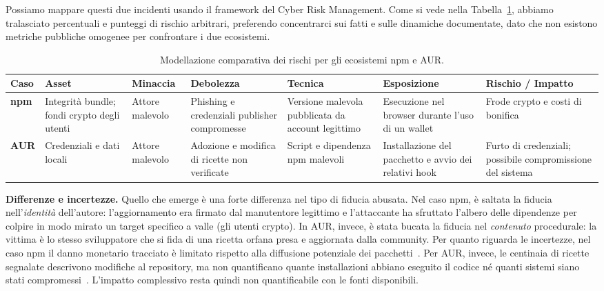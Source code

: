 Possiamo mappare questi due incidenti usando il framework del Cyber Risk Management. Come si vede nella Tabella~\ref{tab:rischi_comparati}, abbiamo tralasciato percentuali e punteggi di rischio arbitrari, preferendo concentrarci sui fatti e sulle dinamiche documentate, dato che non esistono metriche pubbliche omogenee per confrontare i due ecosistemi.

\begin{table}[htbp]
\centering
\footnotesize
\renewcommand{\arraystretch}{1.2}
\begin{tabular}{|p{1.4cm}|p{2cm}|p{1.6cm}|p{2cm}|p{2.3cm}|p{2.1cm}|p{2cm}|}
\hline
\textbf{Caso} & \textbf{Asset} & \textbf{Minaccia} & \textbf{Debolezza} & \textbf{Tecnica} & \textbf{Esposizione} & \textbf{Rischio / Impatto} \\ \hline
\textbf{npm} & Integrità bundle; fondi crypto degli utenti & Attore malevolo & Phishing e credenziali publisher compromesse & Versione malevola pubblicata da account legittimo & Esecuzione nel browser durante l'uso di un wallet & Frode crypto e costi di bonifica \\ \hline
\textbf{AUR} & Credenziali e dati locali & Attore malevolo & Adozione e modifica di ricette non verificate & Script e dipendenza npm malevoli & Installazione del pacchetto e avvio dei relativi hook & Furto di credenziali; possibile compromissione del sistema \\ \hline
\end{tabular}
\caption{Modellazione comparativa dei rischi per gli ecosistemi npm e AUR.}
\label{tab:rischi_comparati}
\end{table}

\textbf{Differenze e incertezze.} Quello che emerge è una forte differenza nel tipo di fiducia abusata. Nel caso npm, è saltata la fiducia nell'\emph{identità} dell'autore: l'aggiornamento era firmato dal manutentore legittimo e l'attaccante ha sfruttato l'albero delle dipendenze per colpire in modo mirato un target specifico a valle (gli utenti crypto). In AUR, invece, è stata bucata la fiducia nel \emph{contenuto} procedurale: la vittima è lo stesso sviluppatore che si fida di una ricetta orfana presa e aggiornata dalla community. 
Per quanto riguarda le incertezze, nel caso npm il danno monetario tracciato è limitato rispetto alla diffusione potenziale dei pacchetti~\cite{debug2025,cso2025}. Per AUR, invece, le centinaia di ricette segnalate descrivono modifiche al repository, ma non quantificano quante installazioni abbiano eseguito il codice né quanti sistemi siano stati compromessi~\cite{arch-aur-incident-2026,ioctl2026}. L'impatto complessivo resta quindi non quantificabile con le fonti disponibili.
